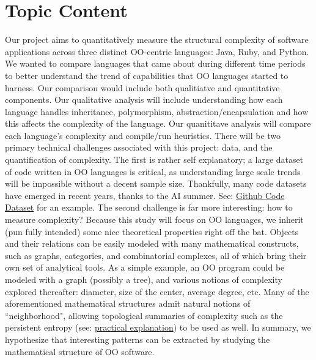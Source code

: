 \documentclass{article}
\begin{document}
\section{Topic Content}
Our project aims to quantitatively measure the structural complexity of software applications across three distinct OO-centric languages: Java, Ruby, and Python. We wanted to compare languages that came about during different time periods to better understand the trend of capabilities that OO languages started to harness. Our comparison would include both qualitiatve and quantitative components. Our qualitative analysis will include understanding how each language handles inheritance, polymorphism, abstraction/encapsulation and how this affects the complexity of the language. Our quanititave analysis will compare each language's complexity and compile/run heuristics.
There will be two primary technical challenges associated with this project: data, and the quantification of complexity. The first is rather self explanatory; a large dataset of code written in OO languages is critical, as understanding large scale trends will be impossible without a decent sample size. Thankfully, many code datasets have emerged in recent years, thanks to the AI summer. See: \href{https://huggingface.co/datasets/codeparrot/github-code}{Github Code Dataset} for an example. The second challenge is far more interesting: how to measure complexity? Because this study will focus on OO languages, we inherit (pun fully intended) some nice theoretical properties right off the bat. Objects and their relations can be easily modeled with many mathematical constructs, such as graphs, categories, and combinatorial complexes, all of which bring their own set of analytical tools. As a simple example, an OO program could be modeled with a graph (possibly a tree), and various notions of complexity explored thereafter: diameter, size of the center, average degree, etc. Many of the aforementioned mathematical structures admit natural notions of ``neighborhood", allowing topological summaries of complexity such as the persistent entropy (see: \href{https://github.com/GUDHI/TDA-tutorial/blob/master/Tuto-GUDHI-persistent-entropy.ipynb}{practical explanation}) to be used as well. In summary, we hypothesize that interesting patterns can be extracted by studying the mathematical structure of OO software.
\end{document}
